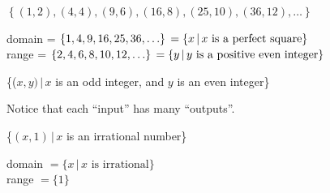 \documentclass{ximera}
\begin{document}
\begin{question}
\begin{problem}
$\left\{ (1,2), (4,4), (9,6), (16,8), (25,10), (36, 12), \ldots \right\}$

\begin{multipleChoice}
    \begin{feedback}
    \begin{solution}
       domain =   $\left\{ 1, 4, 9, 16, 25, 36, \ldots \right\} \\ = \left\{ x \, | \, \text{$x$ is a perfect square} \right\}$ \\ range =  $\left\{ 2, 4, 6, 8, 10, 12, \ldots \right\} \\ = \left\{ y \, | \, \text{$y$ is a positive even integer} \right\}$ 
    \end{solution}
    \end{feedback}
\end{multipleChoice}
\end{problem}    

\begin{problem}
\{($x, y) \, | \, x$ is an odd integer, and $y$ is an even integer\}

\begin{multipleChoice}
    \begin{feedback}
       Notice that each ``input'' has many ``outputs''. 
    \end{feedback}
\end{multipleChoice}
\end{problem}  

\begin{problem}
\{$(x, 1) \, | \, x$ is an irrational number\}

\begin{multipleChoice}
    \begin{feedback}
    \begin{solution}
       domain $= \{x \, | \, \text{$x$ is irrational} \}$ \\ range $= \{ 1\}$ 
    \end{solution}
    \end{feedback}
\end{multipleChoice}
\end{problem}   


\end{question}
\end{document}
